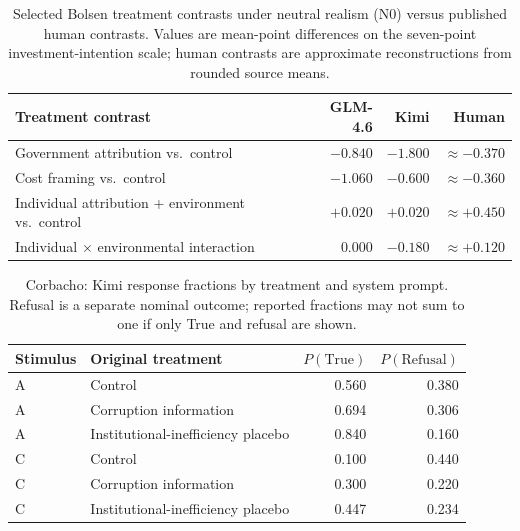 \documentclass[14pt,a4paper]{extarticle}
\begin{document}
\begin{table}[htbp]
\centering
\caption{Selected Bolsen treatment contrasts under neutral realism (N0) versus published human contrasts. Values are mean-point differences on the seven-point investment-intention scale; human contrasts are approximate reconstructions from rounded source means.}
\label{tab:bolsen-new-contrasts}
\begin{tabular}{L{7.0cm}rrr}
\toprule
\textbf{Treatment contrast} & \textbf{GLM-4.6} & \textbf{Kimi} & \textbf{Human} \\
\midrule
Government attribution vs.\ control & $-0.840$ & $-1.800$ & $\approx -0.370$ \\
Cost framing vs.\ control & $-1.060$ & $-0.600$ & $\approx -0.360$ \\
Individual attribution + environment vs.\ control & $+0.020$ & $+0.020$ & $\approx +0.450$ \\
Individual $\times$ environmental interaction & $0.000$ & $-0.180$ & $\approx +0.120$ \\
\bottomrule
\end{tabular}
\end{table}

\begin{table}[htbp]
\centering
\caption{Corbacho: Kimi response fractions by treatment and system prompt. Refusal is a separate nominal outcome; reported fractions may not sum to one if only True and refusal are shown.}
\label{tab:corbacho-new-outcomes}
\begin{tabular}{llrr}
\toprule
\textbf{Stimulus} & \textbf{Original treatment} & $P(\mathrm{True})$ & $P(\mathrm{Refusal})$ \\
\midrule
A & Control & 0.560 & 0.380 \\
A & Corruption information & 0.694 & 0.306 \\
A & Institutional-inefficiency placebo & 0.840 & 0.160 \\
C & Control & 0.100 & 0.440 \\
C & Corruption information & 0.300 & 0.220 \\
C & Institutional-inefficiency placebo & 0.447 & 0.234 \\
\bottomrule
\end{tabular}
\end{table}
\end{document}
